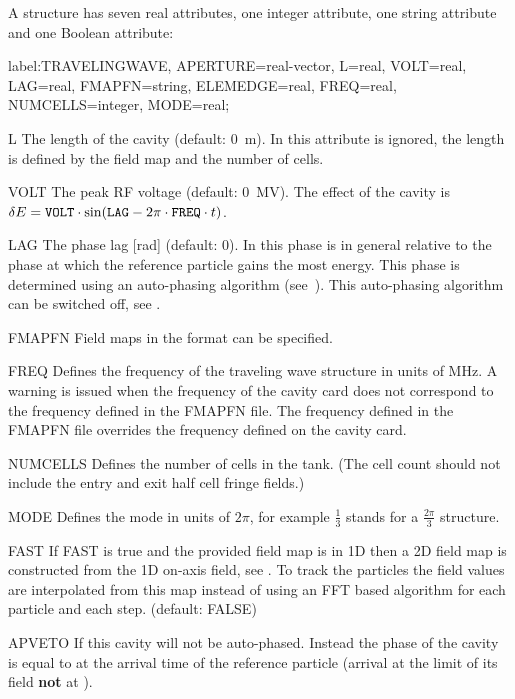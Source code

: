A  structure has seven real attributes, one integer attribute, one string attribute and one Boolean attribute:
\begin{example}
label:TRAVELINGWAVE, APERTURE=real-vector, L=real,
      VOLT=real, LAG=real, FMAPFN=string,
      ELEMEDGE=real, FREQ=real, NUMCELLS=integer,
      MODE=real;
\end{example}

\begin{kdescription}
\item[L]
  The length of the cavity (default: 0~m). In \opalt this attribute is ignored, the length is defined by the field map and the number of cells.
\item[VOLT]
  The peak RF voltage (default: 0~MV).
  The effect of the cavity is
  $\delta E=\text{\keyword{VOLT}}\cdot\sin(\text{\keyword{LAG}}- 2\pi\cdot\text{\keyword{FREQ}}\cdot t)$.
\item[LAG]
  The phase lag [\si{\radian}] (default: 0). In \opalt this phase is in general relative to the phase at which the reference particle gains the most energy. This phase is determined using an auto-phasing algorithm (see~). This auto-phasing algorithm can be switched off, see .
\item[FMAPFN]
  Field maps in the  format can be specified.
\item[FREQ]
  Defines the frequency of the traveling wave structure in units of MHz. A warning is issued when the frequency of
  the cavity card does not correspond to the frequency defined in the  FMAPFN file. The frequency defined in the FMAPFN
  file overrides the frequency defined on the cavity card.
\item[NUMCELLS]
  Defines the number of cells in the tank. (The cell count should not include the entry and exit half cell fringe fields.)
\item[MODE]
Defines the mode in units of $2\pi$, for example $\frac{1}{3}$ stands for a $\frac{2 \pi}{3}$ structure.
\item[FAST]
If FAST is true and the provided field map is in 1D then a 2D field map is constructed from the 1D on-axis field, see . To track the particles the field values are interpolated from this map instead of using an FFT based algorithm for each particle and each step. (default: FALSE)
\item[APVETO]
  If  this cavity will not be auto-phased. Instead the phase of the cavity is equal to  at the arrival time of the reference particle (arrival at the limit of its field {\textbf{not}} at ).
\end{kdescription}

